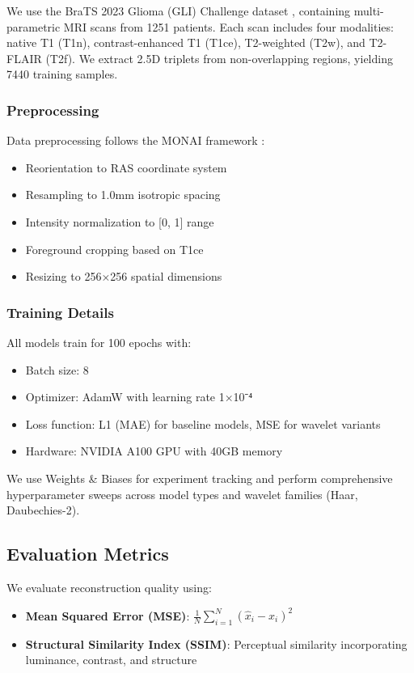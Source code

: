 \documentclass[conference]{IEEEtran}
\begin{document}
We use the BraTS 2023 Glioma (GLI) Challenge dataset \cite{baid2021rsna}, containing multi-parametric MRI scans from 1251 patients. Each scan includes four modalities: native T1 (T1n), contrast-enhanced T1 (T1ce), T2-weighted (T2w), and T2-FLAIR (T2f). We extract 2.5D triplets from non-overlapping regions, yielding 7440 training samples.

\subsubsection{Preprocessing}

Data preprocessing follows the MONAI framework \cite{cardoso2022monai}:
\begin{itemize}
    \item Reorientation to RAS coordinate system
    \item Resampling to 1.0mm isotropic spacing
    \item Intensity normalization to [0, 1] range
    \item Foreground cropping based on T1ce
    \item Resizing to 256×256 spatial dimensions
\end{itemize}

\subsubsection{Training Details}

All models train for 100 epochs with:
\begin{itemize}
    \item Batch size: 8
    \item Optimizer: AdamW with learning rate 1×10⁻⁴
    \item Loss function: L1 (MAE) for baseline models, MSE for wavelet variants
    \item Hardware: NVIDIA A100 GPU with 40GB memory
\end{itemize}

We use Weights \& Biases for experiment tracking and perform comprehensive hyperparameter sweeps across model types and wavelet families (Haar, Daubechies-2).

\subsection{Evaluation Metrics}

We evaluate reconstruction quality using:

\begin{itemize}
    \item \textbf{Mean Squared Error (MSE)}: $\frac{1}{N}\sum_{i=1}^{N}(\hat{x}_i - x_i)^2$
    \item \textbf{Structural Similarity Index (SSIM)}: Perceptual similarity incorporating luminance, contrast, and structure \cite{wang2004image}
\end{itemize}
\end{document}
